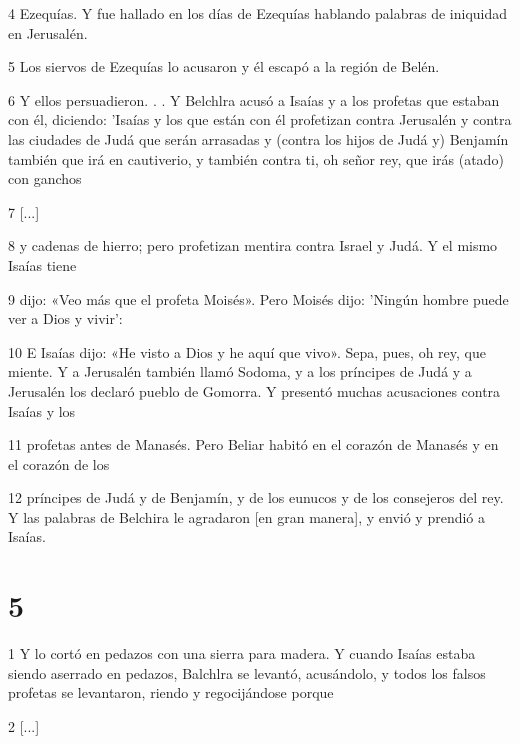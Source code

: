 \par 4 Ezequías. Y fue hallado en los días de Ezequías hablando palabras de iniquidad en Jerusalén.

\par 5 Los siervos de Ezequías lo acusaron y él escapó a la región de Belén.

\par 6 Y ellos persuadieron. . . Y Belchlra acusó a Isaías y a los profetas que estaban con él, diciendo: 'Isaías y los que están con él profetizan contra Jerusalén y contra las ciudades de Judá que serán arrasadas y (contra los hijos de Judá y) Benjamín también que irá en cautiverio, y también contra ti, oh señor rey, que irás (atado) con ganchos

\par 7 [...]

\par 8 y cadenas de hierro; pero profetizan mentira contra Israel y Judá. Y el mismo Isaías tiene

\par 9 dijo: «Veo más que el profeta Moisés». Pero Moisés dijo: 'Ningún hombre puede ver a Dios y vivir':

\par 10 E Isaías dijo: «He visto a Dios y he aquí que vivo». Sepa, pues, oh rey, que miente. Y a Jerusalén también llamó Sodoma, y ​​a los príncipes de Judá y a Jerusalén los declaró pueblo de Gomorra. Y presentó muchas acusaciones contra Isaías y los

\par 11 profetas antes de Manasés. Pero Beliar habitó en el corazón de Manasés y en el corazón de los

\par 12 príncipes de Judá y de Benjamín, y de los eunucos y de los consejeros del rey. Y las palabras de Belchira le agradaron [en gran manera], y envió y prendió a Isaías.

\chapter{5}

\par 1 Y lo cortó en pedazos con una sierra para madera. Y cuando Isaías estaba siendo aserrado en pedazos, Balchlra se levantó, acusándolo, y todos los falsos profetas se levantaron, riendo y regocijándose porque

\par 2 [...]

